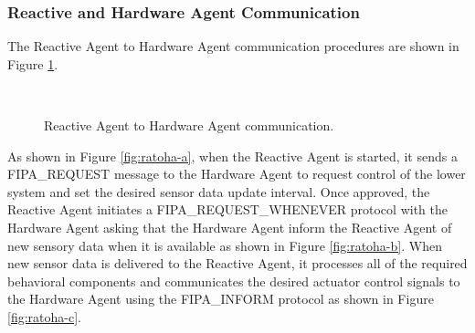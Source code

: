     \subsubsection{Reactive and Hardware Agent Communication}
      The Reactive Agent to Hardware Agent communication procedures are shown
        in Figure \ref{fig:ratoha}.
      \begin{figure}%
      \begin{center}
        \hspace{.5in}
        \\
      \end{center}
      \caption{Reactive Agent to Hardware Agent communication.}
      \label{fig:ratoha}
      \end{figure}
      As shown in Figure \ref{fig:ratoha-a}, when the Reactive Agent is started, 
        it sends a FIPA\_REQUEST message to the Hardware Agent to request control 
        of the lower system and set the desired sensor data update interval.
      Once approved, the Reactive Agent initiates a FIPA\_REQUEST\_WHENEVER
        protocol with the Hardware Agent asking that the Hardware Agent inform 
        the Reactive Agent of new sensory data when it is available as shown
        in Figure \ref{fig:ratoha-b}.
      When new sensor data is delivered to the Reactive Agent, it processes all 
        of the required behavioral components and communicates the desired 
        actuator control signals to the Hardware Agent using the FIPA\_INFORM 
        protocol as shown in Figure \ref{fig:ratoha-c}.

